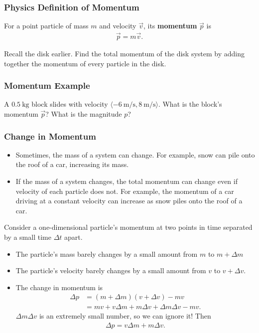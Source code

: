 \documentclass[20pt]{beamer}
\begin{document}
\begin{frame}
	\frametitle{Physics Definition of Momentum}
	\begin{definition}
		For a point particle of mass $m$ and velocity $\vec{v}$, its \textbf{momentum} $\vec{p}$ is
		\begin{align*}
			\vec{p} = m \vec{v}.
		\end{align*}
	\end{definition}
	\begin{example}
		Recall the disk earlier. Find the total momentum of the disk system by adding together the momentum of every particle in the disk.
		\begin{figure}[ht]
			\centering
			\label{fig:disk-example}
		\end{figure}
	\end{example}
\end{frame}

\begin{frame}
	\frametitle{Momentum Example}
	\begin{example}
		A $\SI{0.5}{\kilogram}$ block slides with velocity $\langle \SI{-6}{\meter/\second}, \SI{8}{\meter/\second} \rangle$.
		What is the block's momentum $\vec{p}$?
		What is the magnitude $p$?
	\end{example}
\end{frame}

\begin{frame}
	\frametitle{Change in Momentum}
	\begin{itemize}
		\item Sometimes, the mass of a system can change. For example, snow can pile onto the roof of a car, increasing its mass.
		\item If the mass of a system changes, the total momentum can change even if velocity of each particle does not. For example, the momentum of a car driving at a constant velocity can increase as snow piles onto the roof of a car.
	\end{itemize}
	Consider a one-dimensional particle's momentum at two points in time separated by a small time $\Delta t$ apart.
	\begin{itemize}
		\item The particle's mass barely changes by a small amount from $m$ to $m + \Delta m$
		\item The particle's velocity barely changes by a small amount from $v$ to $v + \Delta v$.
		\item The change in momentum is
		      \begin{align*}
			      \Delta p & = \left(m + \Delta m\right)\left(v + \Delta v\right) - mv \\
			               & = mv + v\Delta m + m \Delta v + \Delta m \Delta v - mv.
		      \end{align*}
		      $\Delta m \Delta v$ is an extremely small number, so we can ignore it! Then
		      \begin{align*}
			      \Delta p = v \Delta m + m \Delta v.
		      \end{align*}
	\end{itemize}
\end{frame}
\end{document}
